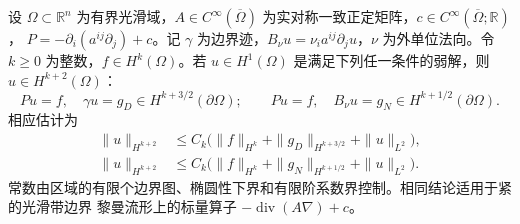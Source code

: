 \begin{theorem}\label{g3:thm:boundary-higher-regularity}
	设 \(\Omega\subset\mathbb R^n\) 为有界光滑域，\(A\in C^\infty(\overline\Omega)\) 为实对称一致正定矩阵，\(c\in C^\infty(\overline\Omega;\mathbb R)\)，
	\(P=-\partial_i(a^{ij}\partial_j)+c\)。记 \(\gamma\) 为边界迹，\(B_\nu u=\nu_i a^{ij}\partial_ju\)，\(\nu\) 为外单位法向。令 \(k\ge0\) 为整数，\(f\in H^k(\Omega)\)。若 \(u\in H^1(\Omega)\) 是满足下列任一条件的弱解，则 \(u\in H^{k+2}(\Omega)\)：
	\[
	Pu=f,\quad\gamma u=g_D\in H^{k+3/2}(\partial\Omega);
	\qquad
	Pu=f,\quad B_\nu u=g_N\in H^{k+1/2}(\partial\Omega).
	\]
	相应估计为
	\begin{align}
	\|u\|_{H^{k+2}}
	&\le C_k\bigl(\|f\|_{H^k}+\|g_D\|_{H^{k+3/2}}
																									+\|u\|_{L^2}\bigr),\label{g3:eq:dirichlet-higher-boundary-estimate}\\
	\|u\|_{H^{k+2}}
	&\le C_k\bigl(\|f\|_{H^k}+\|g_N\|_{H^{k+1/2}}
																									+\|u\|_{L^2}\bigr).\label{g3:eq:neumann-higher-boundary-estimate}
	\end{align}
	常数由区域的有限个边界图、椭圆性下界和有限阶系数界控制。相同结论适用于紧的光滑带边界 黎曼流形上的标量算子
	\(-\operatorname{div}(A\nabla)+c\)。
\end{theorem}
